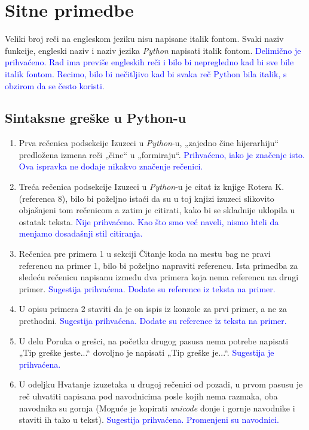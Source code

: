 \documentclass[a4paper]{report}
\newcommand{\odgovor}[1]{\textcolor{blue}{#1}}
\begin{document}
\section{Sitne primedbe}
Veliki broj reči na engleskom jeziku nisu napisane italik fontom. Svaki naziv funkcije, engleski naziv i naziv jezika \emph{Python} napisati italik fontom.
\odgovor{Delimično je prihvaćeno. Rad ima previše engleskih reči i bilo bi nepregledno kad bi sve bile italik fontom. Recimo, bilo bi nečitljivo kad bi svaka reč Python bila italik, s obzirom da se često koristi.}
\subsection{Sintaksne greške u Python-u}
\begin{enumerate}
    \item Prva rečenica podsekcije Izuzeci u \emph{Python}-u, „zajedno čine hijerarhiju“ predložena izmena reči „čine“ u „formiraju“.
    \odgovor{Prihvaćeno, iako je značenje isto. Ova ispravka ne dodaje nikakvo značenje rečenici.}
    \item Treća rečenica podsekcije Izuzeci u \emph{Python}-u je citat iz knjige Rotera K. (referenca 8), bilo bi poželjno istaći da su u toj knjizi izuzeci slikovito objašnjeni tom rečenicom a zatim je citirati, kako bi se skladnije uklopila u ostatak teksta.
    \odgovor{Nije prihvaćeno. Kao što smo već naveli, nismo hteli da menjamo dosadašnji stil citiranja.}
    \item Rečenica pre primera 1 u sekciji Čitanje koda na mestu bag ne pravi referencu na primer 1, bilo bi poželjno napraviti referencu. Ista primedba za sledeću rečenicu napisanu između dva primera koja nema referencu na drugi primer.
    \odgovor{Sugestija prihvaćena. Dodate su reference iz teksta na primer.}
    \item U opisu primera 2 staviti da je on ispis iz konzole za prvi primer, a ne za prethodni.
    \odgovor{Sugestija prihvaćena. Dodate su reference iz teksta na primer.}
    \item U delu Poruka o grešci, na početku drugog pasusa nema potrebe napisati „Tip greške jeste...“ dovoljno je napisati „Tip greške je...“.
    \odgovor{Sugestija je prihvaćena.}
    \item U odeljku Hvatanje izuzetaka u drugoj rečenici od pozadi, u prvom pasusu je reč uhvatiti napisana pod navodnicima posle kojih nema razmaka, oba navodnika su gornja (Moguće je kopirati \emph{unicode} donje i gornje navodnike i staviti ih tako u tekst).
    \odgovor{Sugestija prihvaćena. Promenjeni su navodnici.}
\end{enumerate}
\end{document}
